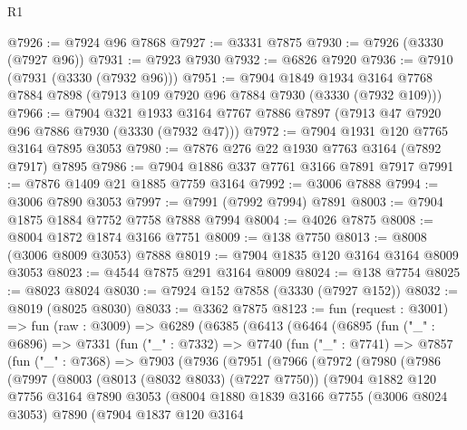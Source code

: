 \begin{lexlean}{R1}
\begin{coremodule}
@7926 := @7924 @96 @7868
@7927 := @3331 @7875
@7930 := @7926 (@3330 (@7927 @96))
@7931 := @7923 @7930
@7932 := @6826 @7920
@7936 := @7910 (@7931 (@3330 (@7932 @96)))
@7951 := @7904
    @1849
    @1934
    @3164
    @7768
    @7884
    @7898
    (@7913 @109 @7920 @96 @7884 @7930 (@3330 (@7932 @109)))
@7966 := @7904
    @321
    @1933
    @3164
    @7767
    @7886
    @7897
    (@7913 @47 @7920 @96 @7886 @7930 (@3330 (@7932 @47)))
@7972 := @7904 @1931 @120 @7765 @3164 @7895 @3053
@7980 := @7876 @276 @22 @1930 @7763 @3164 (@7892 @7917) @7895
@7986 := @7904 @1886 @337 @7761 @3166 @7891 @7917
@7991 := @7876 @1409 @21 @1885 @7759 @3164
@7992 := @3006 @7888
@7994 := @3006 @7890 @3053
@7997 := @7991 (@7992 @7994) @7891
@8003 := @7904 @1875 @1884 @7752 @7758 @7888 @7994
@8004 := @4026 @7875
@8008 := @8004 @1872 @1874 @3166 @7751
@8009 := @138 @7750
@8013 := @8008 (@3006 @8009 @3053) @7888
@8019 := @7904 @1835 @120 @3164 @3164 @8009 @3053
@8023 := @4544 @7875 @291 @3164 @8009
@8024 := @138 @7754
@8025 := @8023 @8024
@8030 := @7924 @152 @7858 (@3330 (@7927 @152))
@8032 := @8019 (@8025 @8030)
@8033 := @3362 @7875
@8123 := fun (request : @3001) =>
  fun (raw : @3009) =>
  @6289
    (@6385
      (@6413
        (@6464
          (@6895
            (fun ("_" : @6896) =>
            @7331
              (fun ("_" : @7332) =>
              @7740
                (fun ("_" : @7741) =>
                @7857
                  (fun ("_" : @7368) =>
                  @7903
                    (@7936
                      (@7951
                        (@7966
                          (@7972
                            (@7980
                              (@7986
                                (@7997
                                  (@8003
                                    (@8013 (@8032 @8033) (@7227 @7750))
                                    (@7904
                                      @1882
                                      @120
                                      @7756
                                      @3164
                                      @7890
                                      @3053
                                      (@8004
                                        @1880
                                        @1839
                                        @3166
                                        @7755
                                        (@3006 @8024 @3053)
                                        @7890
                                        (@7904
                                          @1837
                                          @120
                                          @3164

\end{coremodule}
\end{lexlean}
